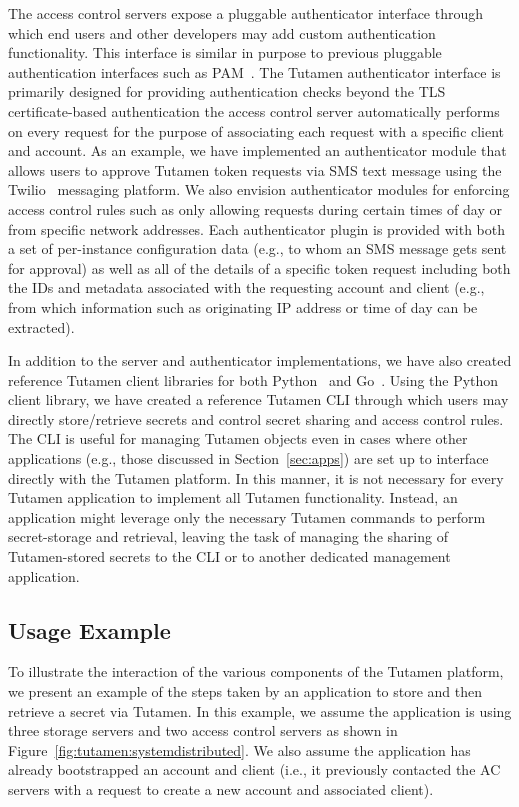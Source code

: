 The access control servers expose a pluggable authenticator interface
through which end users and other developers may add custom
authentication functionality. This interface is similar in purpose to
previous pluggable authentication interfaces such as
PAM~\cite{samar1996}. The Tutamen authenticator interface is primarily
designed for providing authentication checks beyond the TLS
certificate-based authentication the access control server
automatically performs on every request for the purpose of associating
each request with a specific client and account. As an example, we have
implemented an authenticator module that allows users to approve
Tutamen token requests via SMS text message using the
Twilio~\cite{twilio} messaging platform. We also envision
authenticator modules for enforcing access control rules such as only
allowing requests during certain times of day or from specific network
addresses. Each authenticator plugin is provided with both a set of
per-instance configuration data (e.g., to whom an SMS message gets sent
for approval) as well as all of the details of a specific token
request including both the IDs and metadata associated with the
requesting account and client (e.g., from which information such as
originating IP address or time of day can be extracted).

In addition to the server and authenticator implementations, we have
also created reference Tutamen client libraries for both
Python~\cite{src-tutamen-pytutamen} and
Go~\cite{src-tutamen-go}. Using the Python client library, we have
created a reference Tutamen CLI through which users may directly
store/retrieve secrets and control secret sharing and access control
rules. The CLI is useful for managing Tutamen objects even in cases
where other applications (e.g., those discussed in
Section~\ref{sec:apps}) are set up to interface directly with the
Tutamen platform. In this manner, it is not necessary for every Tutamen
application to implement all Tutamen functionality. Instead, an
application might leverage only the necessary Tutamen commands to
perform secret-storage and retrieval, leaving the task of managing the
sharing of Tutamen-stored secrets to the CLI or to another dedicated
management application.

\subsection{Usage Example}

To illustrate the interaction of the various components of the Tutamen
platform, we present an example of the steps taken by an application
to store and then retrieve a secret via Tutamen. In this example, we
assume the application is using three storage servers and two access
control servers as shown in
Figure~\ref{fig:tutamen:systemdistributed}. We also assume the
application has already bootstrapped an account and client (i.e., it
previously contacted the AC servers with a request to create a new
account and associated client).

